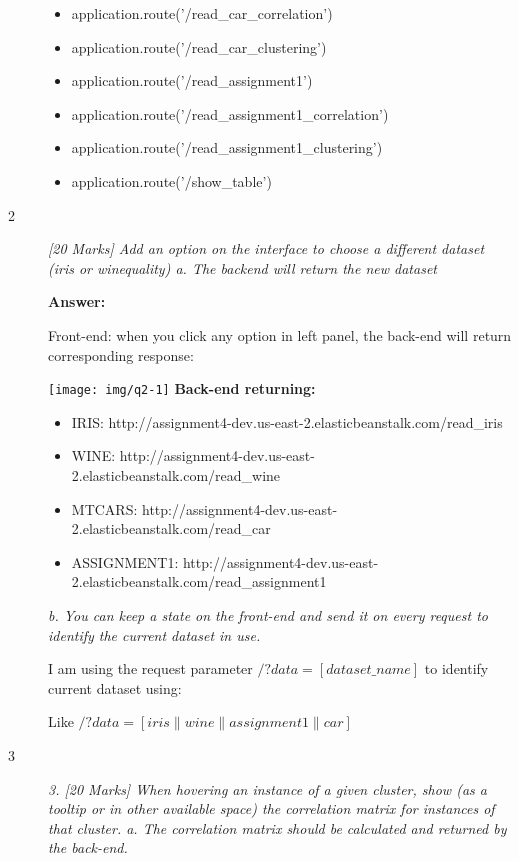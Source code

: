 \documentclass[]{report}
\begin{document}
\begin{description}
\begin{itemize}
\item application.route('/read\_car\_correlation')

\item application.route('/read\_car\_clustering')

\item application.route('/read\_assignment1')

\item application.route('/read\_assignment1\_correlation')

\item application.route('/read\_assignment1\_clustering')

\item application.route('/show\_table')


\end{itemize}


\item[2]
{\em [20 Marks] Add an option on the interface to choose a different dataset (iris or winequality)
a.	The backend will return the new dataset}

\textbf{Answer:}

Front-end: when you click any option in left panel, the back-end will return corresponding response:

\texttt{[image: img/q2-1]}
\bigbreak
\textbf{Back-end returning:}

\begin{itemize}
\item IRIS: http://assignment4-dev.us-east-2.elasticbeanstalk.com/read\_iris

\item WINE: http://assignment4-dev.us-east-2.elasticbeanstalk.com/read\_wine 

\item MTCARS: http://assignment4-dev.us-east-2.elasticbeanstalk.com/read\_car

\item ASSIGNMENT1: http://assignment4-dev.us-east-2.elasticbeanstalk.com/read\_assignment1

\end{itemize}

{\em b.	You can keep a state on the front-end and send it on every request to identify the current dataset in use.}

I am using the request parameter $ /?data=[dataset\_name]$ to identify current dataset using:

Like $ /?data=[iris\|wine\|assignment1\|car] $
\item[3]
{\em 3.	[20 Marks] When hovering an instance of a given cluster, show (as a tooltip or in other available space) the correlation matrix for instances of that cluster.
	a.	The correlation matrix should be calculated and returned by the back-end.
}



\end{description}
\end{document}
